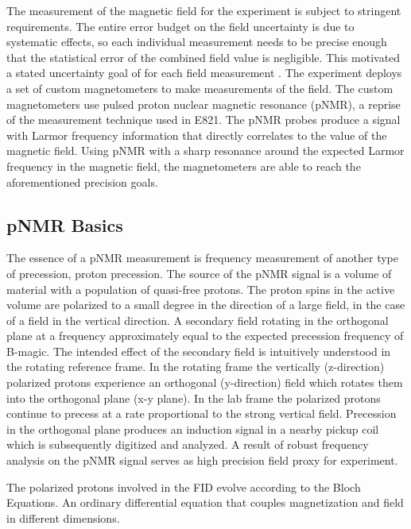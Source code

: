 The measurement of the magnetic field for the \mugmtwo experiment is subject to stringent requirements.  The entire error budget on the field uncertainty is due to systematic effects, so each individual measurement needs to be precise enough that the statistical error of the combined field value is negligible.  This motivated a stated uncertainty goal of  for each field measurement \cite{e989-tdr}.  The experiment deploys a set of custom magnetometers to make measurements of the field.  The custom magnetometers use pulsed proton nuclear magnetic resonance (pNMR), a reprise of the measurement technique used in E821.  The pNMR probes produce a signal with Larmor frequency information that directly correlates to the value of the magnetic field.  Using pNMR with a sharp resonance around the expected Larmor frequency in the \gmtwo magnetic field, the magnetometers are able to reach the aforementioned precision goals.

\subsection{pNMR Basics}

The essence of a pNMR measurement is frequency measurement of another type of precession, proton precession.  The source of the pNMR signal is a volume of material with a population of quasi-free protons.  The proton spins in the active volume are polarized to a small degree in the direction of a large field, in the case of \gmtwo a \bmagic field in the vertical direction.  A secondary field rotating in the orthogonal plane at a frequency approximately equal to the expected precession frequency of B-magic.  The intended effect of the secondary field is intuitively understood in the rotating reference frame.  In the rotating frame the vertically (z-direction) polarized protons experience an orthogonal (y-direction) field which rotates them into the orthogonal plane (x-y plane).  In the lab frame the polarized protons continue to precess at a rate proportional to the strong vertical field.  Precession in the orthogonal plane produces an induction signal in a nearby pickup coil which is subsequently digitized and analyzed.  A result of robust frequency analysis on the pNMR signal serves as high precision field proxy for \gmtwo experiment.

The polarized protons involved in the FID evolve according to the Bloch Equations.  An ordinary differential equation that couples magnetization and field in different dimensions.

